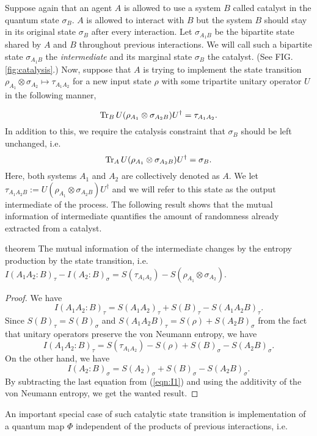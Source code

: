 \documentclass[aps, reprint, amsmath,amssymb, prx, superscriptaddress]{revtex4-2}
\begin{document}
 
 Suppose again that an agent $A$ is allowed to use a system $B$ called catalyst in the quantum state $\sigma_B$. $A$ is allowed to interact with $B$ but the system $B$ should stay in its original state $\sigma_B$ after every interaction. Let $\sigma_{A_1B}$ be the bipartite state shared by $A$ and $B$ throughout previous interactions. We will call such a bipartite state $\sigma_{A_1B}$ the \textit{intermediate} and its marginal state $\sigma_B$ the catalyst. (See FIG. \ref{fig:catalysis}.) Now, suppose that $A$ is trying to implement the state transition $\rho_{A_1} \otimes \sigma_{A_2} \mapsto \tau_{A_1A_2}$ for a new input state $\rho$ with some tripartite unitary operator $U$ in the following manner,
 

\begin{equation}
    \Tr_B U(\rho_{A_1} \otimes \sigma_{A_2B})U^\dag = \tau_{A_1A_2}.
\end{equation}
In addition to this, we require the catalysis constraint that $\sigma_{B}$ should be left unchanged, i.e.
\begin{equation}
    \Tr_A U(\rho_{A_1} \otimes \sigma_{A_2B})U^\dag = \sigma_{B}.
\end{equation}
Here, both systems $A_1$ and $A_2$ are collectively denoted as $A$. We let $\tau_{A_1A_2B}:=U(\rho_{A_1} \otimes \sigma_{A_2B})U^\dag$ and we will refer to this state as the output intermediate of the process. The following result shows that the mutual information of intermediate quantifies the amount of randomness already extracted from a catalyst.

\begin{theoremEnd}{theorem} \label{thm:main}
    The mutual information of the intermediate changes by the entropy production by the state transition, i.e.
    $I(A_1A_2:B)_\tau - I(A_2:B)_\sigma =  S(\tau_{A_1A_2})-S(\rho_{A_1}\otimes \sigma_{A_2})$.
\end{theoremEnd}
\begin{proof}
    We have
     $$I(A_1A_2:B)_\tau=S(A_1A_2)_\tau+S(B)_\tau-S(A_1A_2B)_\tau.$$
     Since $S(B)_\tau=S(B)_\sigma$ and $S(A_1A_2B)_\tau = S(\rho) + S(A_2B)_\sigma$ from the fact that unitary operators preserve the von Neumann entropy, we have
     \begin{equation} \label{eqn:I1}
         I(A_1A_2:B)_\tau = S(\tau_{A_1A_2}) -S(\rho) +  S(B)_\sigma - S(A_2B)_\sigma.
     \end{equation}
     On the other hand, we have
     $$I(A_2:B)_\sigma=S(A_2)_\sigma + S(B)_\sigma - S(A_2B)_\sigma.$$
     By subtracting the last equation from (\ref{eqn:I1}) and using the additivity of the von Neumann entropy, we get the wanted result.
\end{proof}
An important special case of such catalytic state transition is implementation of  a quantum map $\Phi$ independent of the products of previous interactions, i.e. 
\end{document}
